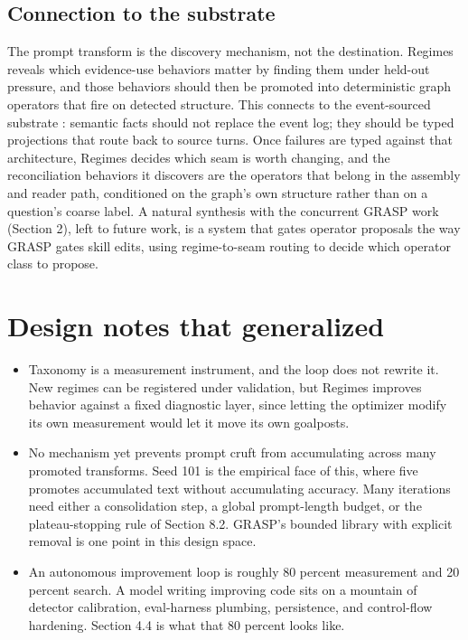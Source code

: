 \subsection{Connection to the substrate}

The prompt transform is the discovery mechanism, not the destination. Regimes reveals which evidence-use behaviors matter by finding them under held-out pressure, and those behaviors should then be promoted into deterministic graph operators that fire on detected structure. This connects to the event-sourced substrate \citep{nakajima2026log}: semantic facts should not replace the event log; they should be typed projections that route back to source turns. Once failures are typed against that architecture, Regimes decides which seam is worth changing, and the reconciliation behaviors it discovers are the operators that belong in the assembly and reader path, conditioned on the graph's own structure rather than on a question's coarse label. A natural synthesis with the concurrent GRASP work (Section 2), left to future work, is a system that gates operator proposals the way GRASP gates skill edits, using regime-to-seam routing to decide which operator class to propose.


\section{Design notes that generalized}

\begin{itemize}
\item Taxonomy is a measurement instrument, and the loop does not rewrite it. New regimes can be registered under validation, but Regimes improves behavior against a fixed diagnostic layer, since letting the optimizer modify its own measurement would let it move its own goalposts.
\item No mechanism yet prevents prompt cruft from accumulating across many promoted transforms. Seed 101 is the empirical face of this, where five promotes accumulated text without accumulating accuracy. Many iterations need either a consolidation step, a global prompt-length budget, or the plateau-stopping rule of Section 8.2. GRASP's bounded library with explicit removal is one point in this design space.
\item An autonomous improvement loop is roughly 80 percent measurement and 20 percent search. A model writing improving code sits on a mountain of detector calibration, eval-harness plumbing, persistence, and control-flow hardening. Section 4.4 is what that 80 percent looks like.
\end{itemize}


